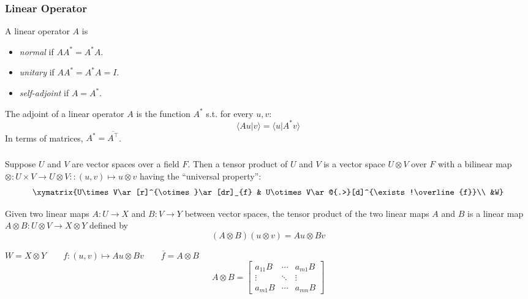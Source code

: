 \documentclass[UTF8,aspectratio=43,11pt,colorlinks,compress,openany]{beamer}%
\begin{document}
\begin{frame}\frametitle{Linear Operator}
\begin{definition}
	A linear operator $A$ is
\begin{itemize}
	\item \emph{normal} if $AA^*=A^* A$.
	\item \emph{unitary} if $AA^*=A^* A=I$.
	\item \emph{self-adjoint} if $A=A^*$.
\end{itemize}
\end{definition}
The adjoint of a linear operator $A$ is the function $A^*$ s.t. for every $u,v$:
\[\langle Au|v\rangle=\langle u|A^* v\rangle\]
In terms of matrices, $A^*=\overline{A^\top}$.
\end{frame}

\begin{frame}\frametitle{}
\setlength\abovedisplayskip{0pt}
\setlength\belowdisplayskip{0pt}
\begin{definition}
Suppose $U$ and $V$ are vector spaces over a field $F$. Then a tensor product of $U$ and $V$ is a vector space $U\otimes V$ over $F$ with a bilinear map $\otimes: U\times V\to U\otimes V :: (u,v)\mapsto u\otimes v$ having the ``universal property'':
\[\xymatrix{U\times V\ar[r]^{\otimes}\ar[dr]_{f} & U\otimes V\ar@{.>}[d]^{\exists!\overline{f}}\\ &W}\]
\end{definition}
\begin{block}{}
	Given two linear maps $A: U \to X$ and $B: V \to Y$ between vector spaces, the tensor product of the two linear maps $A$ and $B$ is a linear map $A\otimes B: U\otimes V\to X\otimes Y$ defined by
\[(A\otimes B)(u\otimes v)=Au\otimes Bv\]
\end{block}
$W=X\otimes Y\qquad f:(u,v)\mapsto Au\otimes Bv\qquad \overline{f}=A\otimes B$
\[
A\otimes B=
\begin{bmatrix}
	a_{11}B &\cdots &a_{m1}B\\
	\vdots &\ddots &\vdots\\
	a_{m1}B &\cdots &a_{mn}B
\end{bmatrix}
\]
\end{frame}
\end{document}
